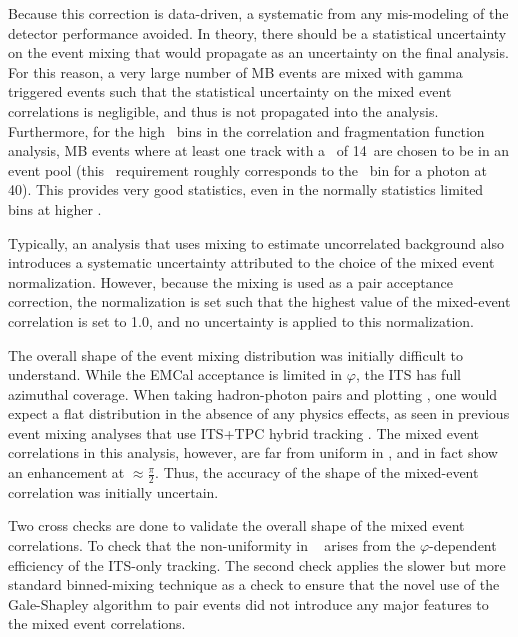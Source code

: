 Because this correction is data-driven, a systematic from any mis-modeling of the detector performance avoided. In theory, there should be a statistical uncertainty on the event mixing that would propagate as an uncertainty on the final analysis. For this reason, a very large number of MB events are mixed with gamma triggered events such that the statistical uncertainty on the mixed event correlations is negligible, and thus is not propagated into the analysis. Furthermore, for the high \zt~bins in the correlation and fragmentation function analysis, MB events where at least one track with a \pt~of 14\GeVc~are chosen to be in an event pool (this \pt~requirement roughly corresponds to the \zt~bin for a photon at 40\GeVc). This provides very good statistics, even in the normally statistics limited bins at higher \zt.

 Typically, an analysis that uses mixing to estimate uncorrelated background also introduces a systematic uncertainty attributed to the choice of the mixed event normalization. However, because the mixing is used as a pair acceptance correction, the normalization is set such that the highest value of the mixed-event correlation is set to 1.0, and no uncertainty is applied to this normalization.

 The overall shape of the event mixing distribution was initially difficult to understand. While the EMCal acceptance is limited in $\varphi$, the ITS has full azimuthal coverage. When taking hadron-photon pairs and plotting \deltaphi, one would expect a flat distribution in the absence of any physics effects, as seen in previous event mixing analyses that use ITS+TPC hybrid tracking \cite{singh}. The mixed event correlations in this analysis, however, are far from uniform in \deltaphi, and in fact show an enhancement at $\approx\frac{\pi}{2}$. Thus, the accuracy of the shape of the mixed-event correlation was initially uncertain.

Two cross checks are done to validate the overall shape of the mixed event correlations. To check that the non-uniformity in \deltaphi~ arises from the $\varphi$-dependent efficiency of the ITS-only tracking. The second check applies the slower but more standard binned-mixing technique as a check to ensure that the novel use of the Gale-Shapley algorithm to pair events did not introduce any major features to the mixed event correlations.

